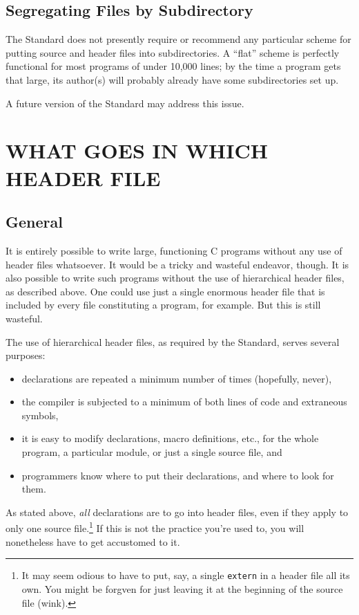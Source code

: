 \subsection{Segregating Files by Subdirectory}
The Standard does not presently require or recommend any particular
scheme for putting source and header files into subdirectories.  A
``flat'' scheme is perfectly functional for most programs of under
10,000 lines; by the time a program gets that large, its author(s)
will probably already have some subdirectories set up.

A future version of the Standard may address this issue.
\newpage

\section{WHAT GOES IN WHICH HEADER FILE}
\subsection{General}
It is entirely possible to write large, functioning C programs without
any use of header files whatsoever.  It would be a tricky and wasteful
endeavor, though.  It is also possible to write such programs without
the use of hierarchical header files, as described above.  One could
use just a single enormous header file that is included by every file
constituting a program, for example.  But this is still wasteful.

The use of hierarchical header files, as required by the Standard,
serves several purposes:
\begin{itemize}
\item declarations are repeated a minimum number of times
(hopefully, never),
\item the compiler is subjected to a minimum of both lines of code and
extraneous symbols,
\item it is easy to modify declarations, macro definitions,
etc., for the whole program, a
particular module, or just a single source file, and
\item programmers know where to put their declarations, and where to look
for them.
\end{itemize}

As stated above, {\em all} declarations are to go into header files,
even if they apply to only one source file.\footnote{It may seem
odious to have to put, say, a single {\tt extern} in a header file all
its own.  You might be forgven for just leaving it at the beginning of
the source file (wink).} If this is not the practice you're used to,
you will nonetheless have to get accustomed to it.

